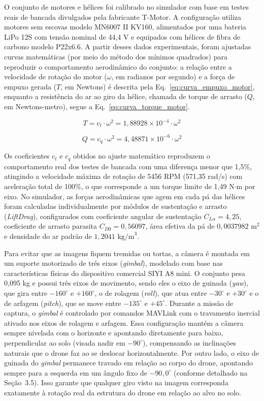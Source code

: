 O conjunto de motores e hélices foi calibrado no simulador com base em testes reais de bancada divulgados pela fabricante T-Motor. A configuração utiliza motores sem escovas modelo MN6007 II KV160, alimentados por uma bateria LiPo 12S com tensão nominal de 44,4 V e equipados com hélices de fibra de carbono modelo P22x6.6. A partir desses dados experimentais, foram ajustadas curvas matemáticas (por meio do método dos mínimos quadrados) para reproduzir o comportamento aerodinâmico do conjunto: a relação entre a velocidade de rotação do motor ($\omega$, em radianos por segundo) e a força de empuxo gerada ($T$, em Newtons) é descrita pela Eq.~\ref{eq:curva_empuxo_motor}, enquanto a resistência do ar ao giro da hélice, chamada de torque de arrasto ($Q$, em Newtons-metro), segue a Eq.~\ref{eq:curva_torque_motor}.

\begin{equation}
    T = c_t \cdot \omega^2 = 1{,}88928 \times 10^{-4} \cdot \omega^2
    \label{eq:curva_empuxo_motor}
\end{equation}

\begin{equation}
    Q = c_q \cdot \omega^2 = 4{,}48871 \times 10^{-6} \cdot \omega^2
    \label{eq:curva_torque_motor}
\end{equation}

Os coeficientes $c_t$ e $c_q$ obtidos no ajuste matemático reproduzem o comportamento real dos testes de bancada com uma diferença menor que 1,5\%, atingindo a velocidade máxima de rotação de 5456 RPM (571,35 rad/s) com aceleração total de 100\%, o que corresponde a um torque limite de 1,49 N$\cdot$m por eixo. No simulador, as forças aerodinâmicas que agem em cada pá das hélices foram calculadas individualmente por módulos de sustentação e arrasto (\textit{LiftDrag}), configurados com coeficiente angular de sustentação $C_{L\alpha} = 4{,}25$, coeficiente de arrasto parasita $C_{D0} = 0{,}56097$, área efetiva da pá de $0{,}0037982\text{ m}^2$ e densidade do ar padrão de $1{,}2041\text{ kg/m}^3$.

Para evitar que as imagens fiquem tremidas ou tortas, a câmera é montada em um suporte motorizado de três eixos (\textit{gimbal}), modelado com base nas características físicas do dispositivo comercial SIYI A8 mini. O conjunto pesa 0,095 kg e possui três eixos de movimento, sendo eles o eixo de guinada (\textit{yaw}), que gira entre $-160^\circ$ e $+160^\circ$, o de rolagem (\textit{roll}), que atua entre $-30^\circ$ e $+30^\circ$ e o de arfagem (\textit{pitch}), que se move entre $-135^\circ$ e $+45^\circ$. Durante a missão de captura, o \textit{gimbal} é controlado por comandos MAVLink com o travamento inercial ativado nos eixos de rolagem e arfagem. Essa configuração mantém a câmera sempre nivelada com o horizonte e apontando diretamente para baixo, perpendicular ao solo (visada nadir em $-90^\circ$), compensando as inclinações naturais que o drone faz ao se deslocar horizontalmente. Por outro lado, o eixo de guinada do \textit{gimbal} permanece travado em relação ao corpo do drone, apontando sempre para a esquerda em um ângulo fixo de $-90{,}0^\circ$ (conforme detalhado na Seção~3.5). Isso garante que qualquer giro visto na imagem corresponda exatamente à rotação real da estrutura do drone em relação ao alvo no solo.

